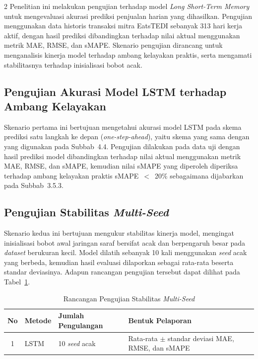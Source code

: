 \documentclass[12pt, a4paper, onecolumn, oneside]{report}
\begin{document}
\begin{spacing}{2}
Penelitian ini melakukan pengujian terhadap model \textit{Long Short-Term Memory} untuk mengevaluasi akurasi prediksi penjualan harian yang dihasilkan. Pengujian menggunakan data historis transaksi mitra EatsTEDI sebanyak 313 hari kerja aktif, dengan hasil prediksi dibandingkan terhadap nilai aktual menggunakan metrik MAE, RMSE, dan sMAPE. Skenario pengujian dirancang untuk menganalisis kinerja model terhadap ambang kelayakan praktis, serta mengamati stabilitasnya terhadap inisialisasi bobot acak.

\subsection{Pengujian Akurasi Model LSTM terhadap Ambang Kelayakan}

Skenario pertama ini bertujuan mengetahui akurasi model LSTM pada skema prediksi satu langkah ke depan (\textit{one-step-ahead}), yaitu skema yang sama dengan yang digunakan pada Subbab~4.4. Pengujian dilakukan pada data uji dengan hasil prediksi model dibandingkan terhadap nilai aktual menggunakan metrik MAE, RMSE, dan sMAPE, kemudian nilai sMAPE yang diperoleh diperiksa terhadap ambang kelayakan praktis sMAPE~$<$~20\% sebagaimana dijabarkan pada Subbab~3.5.3.

\subsection{Pengujian Stabilitas \textit{Multi-Seed}}

Skenario kedua ini bertujuan mengukur stabilitas kinerja model, mengingat inisialisasi bobot awal jaringan saraf bersifat acak dan berpengaruh besar pada \textit{dataset} berukuran kecil. Model dilatih sebanyak 10 kali menggunakan \textit{seed} acak yang berbeda, kemudian hasil evaluasi dilaporkan sebagai rata-rata beserta standar deviasinya. Adapun rancangan pengujian tersebut dapat dilihat pada Tabel~\ref{tab:skenario2}.

\begin{table}[H]
\centering
\caption{Rancangan Pengujian Stabilitas \textit{Multi-Seed}}
\label{tab:skenario2}
\begin{tabularx}{\textwidth}{|c|l|l|X|}
\hline
\textbf{No} & \textbf{Metode} & \textbf{Jumlah Pengulangan} & \textbf{Bentuk Pelaporan} \\ \hline
1 & LSTM & 10 \textit{seed} acak & Rata-rata $\pm$ standar deviasi MAE, RMSE, dan sMAPE \\ \hline
\end{tabularx}
\end{table}


\end{spacing}
\end{document}
